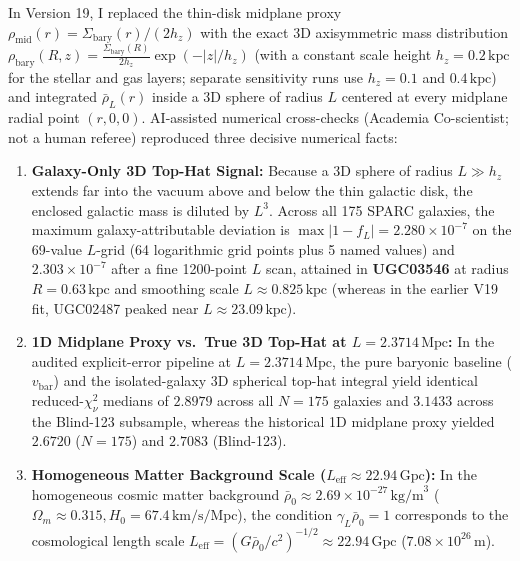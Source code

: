 \documentclass[10pt,a4paper]{article}
\begin{document}
\par
In Version 19, I replaced the thin-disk midplane proxy $\rho_{\text{mid}}(r) = \Sigma_{\text{bary}}(r)/(2h_z)$ with the exact 3D axisymmetric mass distribution $\rho_{\text{bary}}(R,z) = \frac{\Sigma_{\text{bary}}(R)}{2h_z}\exp(-|z|/h_z)$ (with a constant scale height $h_z = 0.2\,\text{kpc}$ for the stellar and gas layers; separate sensitivity runs use $h_z = 0.1$ and $0.4\,\text{kpc}$) and integrated $\bar{\rho}_L(r)$ inside a 3D sphere of radius $L$ centered at every midplane radial point $(r,0,0)$. AI-assisted numerical cross-checks (Academia Co-scientist; not a human referee) reproduced three decisive numerical facts:
\begin{enumerate}\setlength{\itemsep}{1pt}\setlength{\parskip}{0pt}\setlength{\topsep}{1pt}
  \item \textbf{Galaxy-Only 3D Top-Hat Signal:} Because a 3D sphere of radius $L \gg h_z$ extends far into the vacuum above and below the thin galactic disk, the enclosed galactic mass is diluted by $L^3$. Across all 175 SPARC galaxies, the maximum galaxy-attributable deviation is $\max |1 - f_L| = 2.280\times 10^{-7}$ on the 69-value $L$-grid (64 logarithmic grid points plus 5 named values) and \textbf{$2.303\times 10^{-7}$} after a fine 1200-point $L$ scan, attained in \textbf{UGC03546} at radius $R = 0.63\,\text{kpc}$ and smoothing scale $L \approx 0.825\,\text{kpc}$ (whereas in the earlier V19 fit, UGC02487 peaked near $L \approx 23.09\,\text{kpc}$).
  \item \textbf{1D Midplane Proxy vs.\ True 3D Top-Hat at $L = 2.3714\,\text{Mpc}$:} In the audited explicit-error pipeline at $L = 2.3714\,\text{Mpc}$, the pure baryonic baseline ($v_{\text{bar}}$) and the isolated-galaxy 3D spherical top-hat integral yield identical reduced-$\chi^2_\nu$ medians of \textbf{$2.8979$} across all $N=175$ galaxies and \textbf{$3.1433$} across the Blind-123 subsample, whereas the historical 1D midplane proxy yielded $2.6720$ ($N=175$) and $2.7083$ (Blind-123).
  \item \textbf{Homogeneous Matter Background Scale ($L_{\text{eff}} \approx 22.94\,\text{Gpc}$):} In the homogeneous cosmic matter background $\bar{\rho}_0 \approx 2.69\times 10^{-27}\,\text{kg/m}^3$ ($\Omega_m \approx 0.315, H_0 = 67.4\,\text{km/s/Mpc}$), the condition $\gamma_L\bar{\rho}_0 = 1$ corresponds to the cosmological length scale $L_{\text{eff}} = (G\bar{\rho}_0/c^2)^{-1/2} \approx 22.94\,\text{Gpc}$ ($7.08\times 10^{26}\,\text{m}$).
\end{enumerate}
\end{document}
